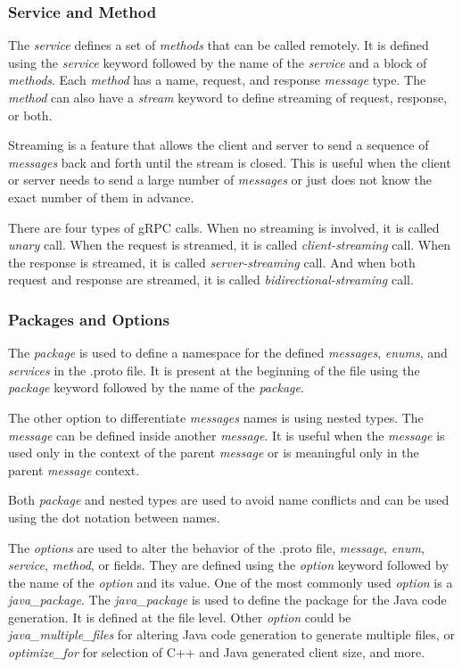 \subsubsection{Service and Method}
The \textit{service} defines a set of \textit{methods} that can be called remotely.
It is defined using the \textit{service} keyword followed by the name of the \textit{service} and a block of \textit{methods}.
Each \textit{method} has a name, request, and response \textit{message} type.
The \textit{method} can also have a \textit{stream} keyword to define streaming of request, response, or both.
\cite{protobuf-proto3}

Streaming is a feature that allows the client and server to send a sequence of \textit{messages} back and forth until the stream is closed.
This is useful when the client or server needs to send a large number of \textit{messages} or just does not know the exact number of them in advance.
\cite{protobuf-proto3}

There are four types of gRPC calls.
When no streaming is involved, it is called \textit{unary} call.
When the request is streamed, it is called \textit{client-streaming} call.
When the response is streamed, it is called \textit{server-streaming} call.
And when both request and response are streamed, it is called \textit{bidirectional-streaming} call.
\cite{grpc-core-concept}

\subsubsection{Packages and Options}
The \textit{package} is used to define a namespace for the defined \textit{messages}, \textit{enums}, and \textit{services} in the .proto file.
It is present at the beginning of the file using the \textit{package} keyword followed by the name of the \textit{package}.
\cite{protobuf-proto3}

The other option to differentiate \textit{messages} names is using nested types.
The \textit{message} can be defined inside another \textit{message}.
It is useful when the \textit{message} is used only in the context of the parent \textit{message} or is meaningful only in the parent \textit{message} context.
\cite{protobuf-proto3}

Both \textit{package} and nested types are used to avoid name conflicts and can be used using the dot notation between names.

The \textit{options} are used to alter the behavior of the .proto file, \textit{message}, \textit{enum}, \textit{service}, \textit{method}, or fields.
They are defined using the \textit{option} keyword followed by the name of the \textit{option} and its value.
One of the most commonly used \textit{option} is a \textit{java\_package}.
The \textit{java\_package} is used to define the package for the Java code generation.
It is defined at the file level.
Other \textit{option} could be \textit{java\_multiple\_files} for altering Java code generation to generate multiple files, or \textit{optimize\_for} for selection of C++ and Java generated client size, and more.
\cite{protobuf-proto3}

